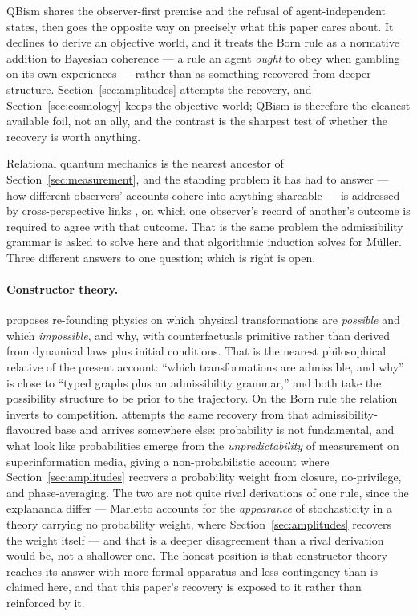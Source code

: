 \documentclass[11pt,a4paper]{article}
\theoremstyle{remark}\newtheorem{remark}[definition]{Remark}
\begin{document}
QBism \citep{fuchs2013} shares the observer-first premise and the refusal of
agent-independent states, then goes the opposite way on precisely what this paper cares
about. It declines to derive an objective world, and it treats the Born rule as a
normative addition to Bayesian coherence --- a rule an agent \emph{ought} to obey when
gambling on its own experiences --- rather than as something recovered from deeper
structure. Section~\ref{sec:amplitudes} attempts the recovery, and
Section~\ref{sec:cosmology} keeps the objective world; QBism is therefore the cleanest
available foil, not an ally, and the contrast is the sharpest test of whether the
recovery is worth anything.

Relational quantum mechanics \citep{rovelli1996} is the nearest ancestor of
Section~\ref{sec:measurement}, and the standing problem it has had to answer --- how
different observers' accounts cohere into anything shareable --- is addressed by
cross-perspective links \citep{adlamrovelli2023}, on which one observer's record of
another's outcome is required to agree with that outcome. That is the same problem the
admissibility grammar is asked to solve here and that algorithmic induction solves for
M\"uller. Three different answers to one question; which is right is open.

\paragraph{Constructor theory.} \citet{deutsch2013} proposes re-founding physics on
which physical transformations are \emph{possible} and which \emph{impossible}, and why,
with counterfactuals primitive rather than derived from dynamical laws plus initial
conditions. That is the nearest philosophical relative of the present account: ``which
transformations are admissible, and why'' is close to ``typed graphs plus an
admissibility grammar,'' and both take the possibility structure to be prior to the
trajectory. On the Born rule the relation inverts to competition.
\citet{marletto2016} attempts the same recovery from that admissibility-flavoured base
and arrives somewhere else: probability is not fundamental, and what look like
probabilities emerge from the \emph{unpredictability} of measurement on
superinformation media, giving a non-probabilistic account where
Section~\ref{sec:amplitudes} recovers a probability weight from closure, no-privilege,
and phase-averaging. The two are not quite rival derivations of one rule, since the
explananda differ --- Marletto accounts for the \emph{appearance} of stochasticity in a theory
carrying no probability weight, where Section~\ref{sec:amplitudes} recovers the weight itself ---
and that is a deeper disagreement than a rival derivation would be, not a shallower one. The
honest position is that constructor theory reaches its answer with more formal apparatus and
less contingency than is claimed here, and that this paper's recovery is exposed to it rather
than reinforced by it.
\end{document}
